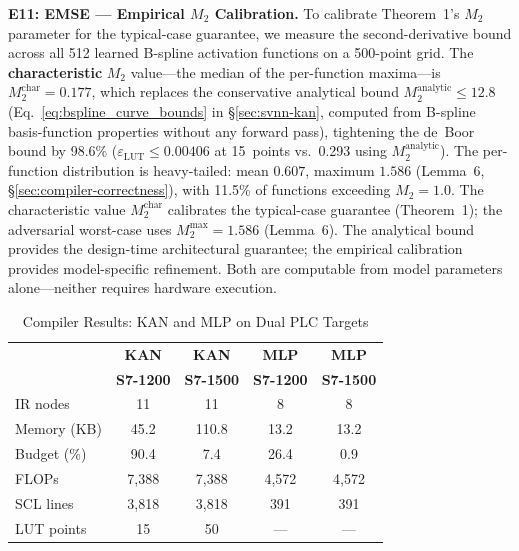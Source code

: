 \documentclass[journal,onecolumn]{IEEEtran}
\begin{document}
\noindent\textbf{E11: EMSE --- Empirical $M_2$ Calibration.}
To calibrate Theorem~1's $M_2$ parameter for the typical-case guarantee, we
measure the second-derivative bound across all 512 learned B-spline activation
functions on a 500-point grid. The \textbf{characteristic} $M_2$ value---the
median of the per-function maxima---is
$M_2^{\text{char}} = 0.177$, which replaces the conservative analytical bound
$M_2^{\text{analytic}} \leq 12.8$ (Eq.~\ref{eq:bspline_curve_bounds} in
{\S}\ref{sec:svnn-kan}, computed from B-spline basis-function properties
without any forward pass), tightening the de~Boor bound by 98.6\%
($\varepsilon_{\text{LUT}} \leq 0.00406$ at 15~points vs.\ 0.293 using
$M_2^{\text{analytic}}$). The per-function distribution is heavy-tailed:
mean $0.607$, maximum $1.586$ (Lemma~6, {\S}\ref{sec:compiler-correctness}),
with 11.5\% of functions exceeding $M_2 = 1.0$. The characteristic value
$M_2^{\text{char}}$ calibrates the typical-case guarantee (Theorem~1); the
adversarial worst-case uses $M_2^{\max}=1.586$ (Lemma~6). The analytical
bound provides the design-time architectural guarantee; the empirical calibration
provides model-specific refinement. Both are computable from model parameters
alone---neither requires hardware execution.

\begin{table}[t]
\centering
\caption{Compiler Results: KAN and MLP on Dual PLC Targets}
\label{tab:compiler}
\small
\footnotesize
\begin{tabular}{lcccc}
\toprule
& \textbf{KAN} & \textbf{KAN} & \textbf{MLP} & \textbf{MLP} \\
& \textbf{S7-1200} & \textbf{S7-1500} & \textbf{S7-1200} & \textbf{S7-1500} \\
\midrule
IR nodes   & 11 & 11 & 8 & 8 \\
Memory (KB)& 45.2 & 110.8 & 13.2 & 13.2 \\
Budget (\%)& 90.4 & 7.4 & 26.4 & 0.9 \\
FLOPs      & 7,388 & 7,388 & 4,572 & 4,572 \\
SCL lines  & 3,818 & 3,818 & 391 & 391 \\
LUT points & 15 & 50 & --- & --- \\
\bottomrule
\end{tabular}
\end{table}
\end{document}
